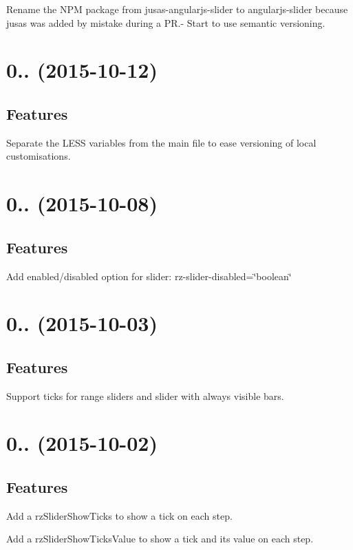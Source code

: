 \begin{DoxyItemize}
\item Rename the N\+PM package from jusas-\/angularjs-\/slider to angularjs-\/slider because jusas was added by mistake during a PR.-\/ Start to use semantic versioning.
\end{DoxyItemize}

\section*{0.. (2015-\/10-\/12)}

\subsection*{Features}


\begin{DoxyItemize}
\item Separate the L\+E\+SS variables from the main file to ease versioning of local customisations.
\end{DoxyItemize}

\section*{0.. (2015-\/10-\/08)}

\subsection*{Features}


\begin{DoxyItemize}
\item Add enabled/disabled option for slider\+: {\ttfamily rz-\/slider-\/disabled=\char`\"{}boolean\char`\"{}}
\end{DoxyItemize}

\section*{0.. (2015-\/10-\/03)}

\subsection*{Features}


\begin{DoxyItemize}
\item Support ticks for range sliders and slider with always visible bars.
\end{DoxyItemize}

\section*{0.. (2015-\/10-\/02)}

\subsection*{Features}


\begin{DoxyItemize}
\item Add a {\ttfamily rz\+Slider\+Show\+Ticks} to show a tick on each step.
\item Add a {\ttfamily rz\+Slider\+Show\+Ticks\+Value} to show a tick and its value on each step. 
\end{DoxyItemize}